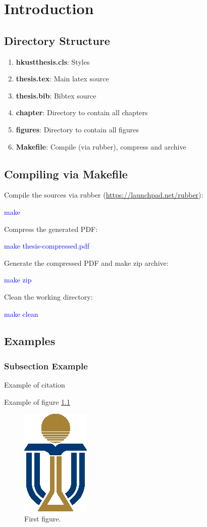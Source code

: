 \chapter{Introduction}
\section{Directory Structure}
\begin{enumerate}
    \item {\bf hkustthesis.cls}: Styles
    \item {\bf thesis.tex}: Main latex source
    \item {\bf thesis.bib}: Bibtex source
    \item {\bf chapter}: Directory to contain all chapters
    \item {\bf figures}: Directory to contain all figures
    \item {\bf Makefile}: Compile (via rubber), compress and archive
\end{enumerate}

\section{Compiling via Makefile}
Compile the sources via rubber (\url{https://launchpad.net/rubber}):

\textcolor{blue}{make}

Compress the generated PDF:

\textcolor{blue}{make thesis-compressed.pdf}

Generate the compressed PDF and make zip archive:

\textcolor{blue}{make zip}

Clean the working directory:

\textcolor{blue}{make clean}

\section{Examples}
\subsection{Subsection Example}
Example of citation \cite{Chapman1970}

Example of figure \ref{figure:figure_example}
\begin{figure}[h]
    \centering
    \includegraphics{figures/figures-logo.eps}
    \caption{First figure.}
    \label{figure:figure_example}
\end{figure}

